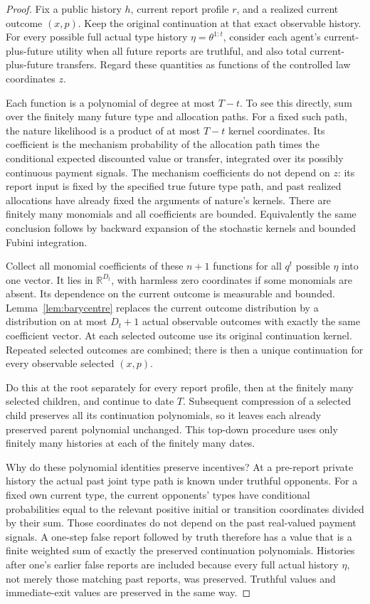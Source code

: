 \documentclass[11pt,a4paper]{article}
\begin{document}
\begin{proof}
Fix a public history $h$, current report profile $r$, and a realized
current outcome $(x,p)$. Keep the original continuation at that exact
observable history. For every possible full actual type history
$\eta=\theta^{1:t}$, consider each agent's current-plus-future utility
when all future reports are truthful, and also total current-plus-future
transfers. Regard these quantities as functions of the controlled law
coordinates $z$.

Each function is a polynomial of degree at most $T-t$. To see this
directly, sum over the finitely many future type and allocation paths.
For a fixed such path, the nature likelihood is a product of at most
$T-t$ kernel coordinates. Its coefficient is the mechanism probability
of the allocation path times the conditional expected discounted value
or transfer, integrated over its possibly continuous payment signals.
The mechanism coefficients do not depend on $z$: its report input is
fixed by the specified true future type path, and past realized
allocations have already fixed the arguments of nature's kernels.
There are finitely many monomials and all coefficients are bounded.
Equivalently the same conclusion follows by backward expansion of
the stochastic kernels and bounded Fubini integration.

Collect all monomial coefficients of these $n+1$ functions for all
$q^t$ possible $\eta$ into one vector. It lies in
$\mathbb R^{D_t}$, with harmless zero coordinates if some monomials
are absent. Its dependence on the current outcome is measurable and
bounded. Lemma~\ref{lem:barycentre} replaces the current outcome
distribution by a distribution on at most $D_t+1$ actual observable
outcomes with exactly the same coefficient vector. At each selected
outcome use its original continuation kernel. Repeated selected
outcomes are combined; there is then a unique continuation for every
observable selected $(x,p)$.

Do this at the root separately for every report profile, then at the
finitely many selected children, and continue to date $T$. Subsequent
compression of a selected child preserves all its continuation
polynomials, so it leaves each already preserved parent polynomial
unchanged. This top-down procedure uses only finitely many histories
at each of the finitely many dates.

Why do these polynomial identities preserve incentives? At a pre-report
private history the actual past joint type path is known under truthful
opponents. For a fixed own current type, the current opponents' types
have conditional probabilities equal to the relevant positive initial
or transition coordinates divided by their sum. Those coordinates do
not depend on the past real-valued payment signals. A one-step false
report followed by truth therefore has a value that is a finite weighted
sum of exactly the preserved continuation polynomials. Histories after
one's earlier false reports are included because every full actual
history $\eta$, not merely those matching past reports, was preserved.
Truthful values and immediate-exit values are preserved in the same way.


\end{proof}
\end{document}
